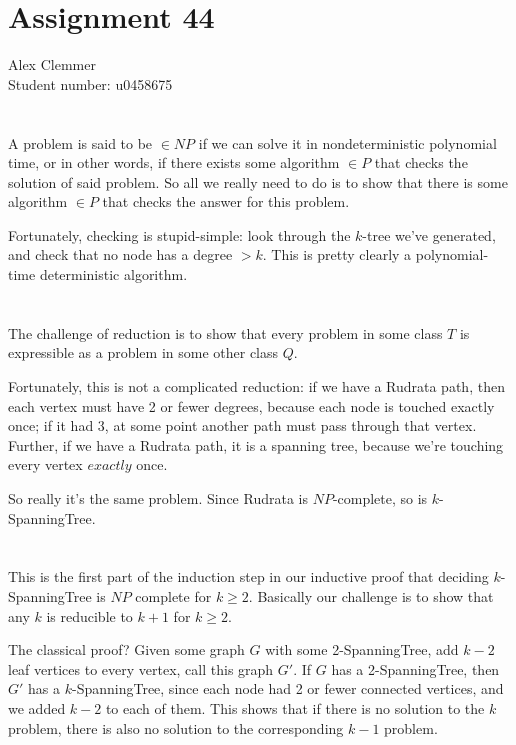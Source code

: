\documentclass[a4paper]{article}
\begin{document}
\section*{Assignment 44}
Alex Clemmer\\
Student number: u0458675

\section{}

A problem is said to be $\in NP$ if we can solve it in nondeterministic polynomial time, or in other words, if there exists some algorithm $\in P$ that checks the solution of said problem. So all we really need to do is to show that there is some algorithm $\in P$ that checks the answer for this problem.

Fortunately, checking is stupid-simple: look through the $k$-tree we've generated, and check that no node has a degree $> k$. This is pretty clearly a polynomial-time deterministic algorithm.

\section{}

The challenge of reduction is to show that every problem in some class $T$ is expressible as a problem in some other class $Q$.

Fortunately, this is not a complicated reduction: if we have a Rudrata path, then each vertex must have 2 or fewer degrees, because each node is touched exactly once; if it had 3, at some point another path must pass through that vertex. Further, if we have a Rudrata path, it is a spanning tree, because we're touching every vertex $\textit{exactly}$ once.

So really it's the same problem. Since Rudrata is $NP$-complete, so is $k$-SpanningTree.

\section{}

This is the first part of the induction step in our inductive proof that deciding $k$-SpanningTree is $NP$ complete for $k \ge 2$. Basically our challenge is to show that any $k$ is reducible to $k+1$ for $k \ge 2$.

The classical proof? Given some graph $G$ with some 2-SpanningTree, add $k-2$ leaf vertices to every vertex, call this graph $G'$. If $G$ has a 2-SpanningTree, then $G'$ has a $k$-SpanningTree, since each node had 2 or fewer connected vertices, and we added $k-2$ to each of them. This shows that if there is no solution to the $k$ problem, there is also no solution to the corresponding $k-1$ problem.
\end{document}
